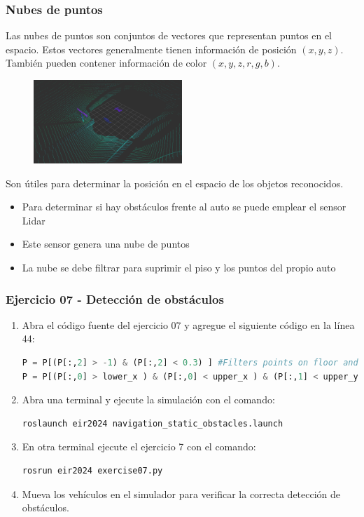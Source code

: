 \begin{frame}\frametitle{Nubes de puntos}
  Las nubes de puntos son conjuntos de vectores que representan puntos en el espacio. Estos vectores generalmente tienen información de posición $(x,y,z)$. También pueden contener información de color $(x,y,z,r,g,b)$.
  \begin{figure}
      \centering
      \includegraphics[width=0.5\textwidth]{Figuras/CloudExample.png}
  \end{figure}
  Son útiles para determinar la posición en el espacio de los objetos reconocidos.
  \begin{itemize}
  \item Para determinar si hay obstáculos frente al auto se puede emplear el sensor Lidar
  \item Este sensor genera una nube de puntos
  \item La nube se debe filtrar para suprimir el piso y los puntos del propio auto
  \end{itemize}
\end{frame}

\begin{frame}[containsverbatim]\frametitle{Ejercicio 07 - Detección de obstáculos}
  \begin{enumerate}
  \item Abra el código fuente del ejercicio 07 y agregue el siguiente código en la línea 44:
    \begin{lstlisting}[language=Python,firstnumber=44]
P = P[(P[:,2] > -1) & (P[:,2] < 0.3) ] #Filters points on floor and higher points
P = P[(P[:,0] > lower_x ) & (P[:,0] < upper_x ) & (P[:,1] < upper_y ) & (P[:,1] > lower_y )]      
    \end{lstlisting}
     \item Abra una terminal y ejecute la simulación con el comando:
    \begin{lstlisting}[language=bash,numbers=none]
roslaunch eir2024 navigation_static_obstacles.launch
    \end{lstlisting}
  \item En otra terminal ejecute el ejercicio 7 con el comando:
    \begin{lstlisting}[language=bash,numbers=none]
rosrun eir2024 exercise07.py
    \end{lstlisting}
  \item Mueva los vehículos en el simulador para verificar la correcta detección de obstáculos. 
  \end{enumerate}
\end{frame}


